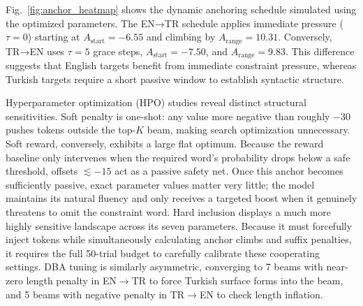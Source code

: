 \documentclass[conference]{IEEEtran}
\begin{document}
Fig.~\ref{fig:anchor_heatmap} shows the dynamic anchoring schedule simulated using the optimized parameters. The EN→TR schedule applies immediate pressure ($\tau = 0$) starting at $A_{\text{start}} = -6.55$ and climbing by $A_{\text{range}} = 10.31$. Conversely, TR→EN uses $\tau = 5$ grace steps, $A_{\text{start}} = -7.50$, and $A_{\text{range}} = 9.83$. This difference suggests that English targets benefit from immediate constraint pressure, whereas Turkish targets require a short passive window to establish syntactic structure.

Hyperparameter optimization (HPO) studies reveal distinct structural sensitivities. Soft penalty is one-shot: any value more negative than roughly $-30$ pushes tokens outside the top-$K$ beam, making search optimization unnecessary. Soft reward, conversely, exhibits a large flat optimum. Because the reward baseline only intervenes when the required word's probability drops below a safe threshold, offsets $\lesssim -15$ act as a passive safety net. Once this anchor becomes sufficiently passive, exact parameter values matter very little; the model maintains its natural fluency and only receives a targeted boost when it genuinely threatens to omit the constraint word. Hard inclusion displays a much more highly sensitive landscape across its seven parameters. Because it must forcefully inject tokens while simultaneously calculating anchor climbs and suffix penalties, it requires the full 50-trial budget to carefully calibrate these cooperating settings. DBA tuning is similarly asymmetric, converging to 7 beams with near-zero length penalty in EN$\rightarrow$TR to force Turkish surface forms into the beam, and 5 beams with negative penalty in TR$\rightarrow$EN to check length inflation.

\clearpage
\end{document}
